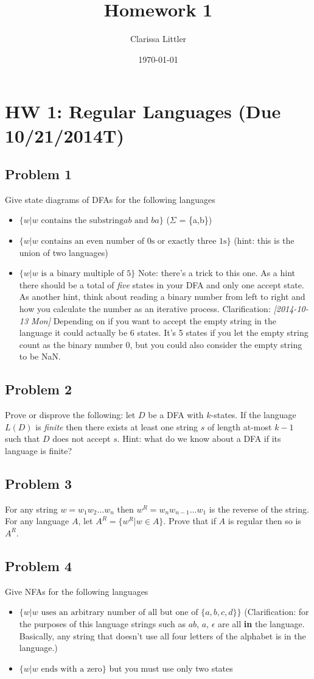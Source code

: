 \documentclass[11pt]{article}
\author{Clarissa Littler}
\date{\today}
\title{Homework 1}
\begin{document}
\maketitle

\section{HW 1: Regular Languages (Due 10/21/2014T)}
\label{sec-1}
\subsection{Problem 1}
\label{sec-1-1}
Give state diagrams of DFAs for the following languages
\begin{itemize}
\item $\{ w | w \text{ contains the substring} ab \text{ and } ba  \}$ ($\Sigma$ = \{a,b\})
\item $\{ w | w \text{ contains an even number of 0s or exactly three 1s} \}$ (hint: this is the union of two languages)
\item $\{ w | w \text{ is a binary multiple of 5} \}$ Note: there's a trick to this one. As a hint there should be a total of \emph{five} states in your DFA and only one accept state. As another hint, think about reading a binary number from left to right and how you calculate the number as an iterative process. Clarification: \textit{[2014-10-13 Mon]} Depending on if you want to accept the empty string in the language it could actually be 6 states. It's 5 states if you let the empty string count as the binary number 0, but you could also consider the empty string to be NaN.
\end{itemize}
\subsection{Problem 2}
\label{sec-1-2}
Prove or disprove the following: let $D$ be a DFA with $k$-states. If the language $L(D)$ is \emph{finite} then there exists at least one string $s$ of length at-most $k-1$ such that $D$ does not accept  $s$. Hint: what do we know about a DFA if its language is finite?
\subsection{Problem 3}
\label{sec-1-3}
For any string $w=w_1 w_2 \ldots w_n$ then $w^R = w_n w_{n-1} \ldots w_1$ is the reverse of the string. For any language $A$, let $A^R = \{ w^R | w \in A \}$. Prove that if $A$ is regular then so is $A^R$. 
\subsection{Problem 4}
\label{sec-1-4}
Give NFAs for the following languages 
\begin{itemize}
\item $\{ w | w \text{ uses an arbitrary number of all but one of } \{a,b,c,d\} \}$ (Clarification: for the purposes of this language strings such as $ab$, $a$, $\epsilon$ are all \textbf{in} the language. Basically, any string that doesn't use all four letters of the alphabet is in the language.)
\item $\{ w | w \text{ ends with a zero} \}$ but you must use only two states
\end{itemize}
\end{document}
